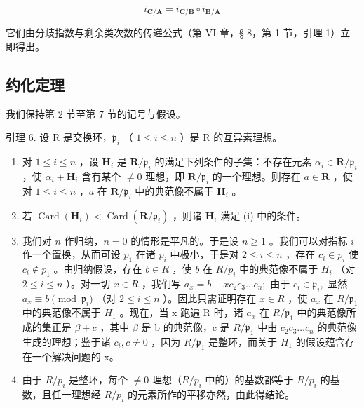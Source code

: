 \[
i _ {\mathbf {C} / \mathbf {A}} = i _ {\mathbf {C} / \mathbf {B}} \circ i _ {\mathbf {B} / \mathbf {A}}
\]

它们由分歧指数与剩余类次数的传递公式（第 VI 章，§ 8，第 1 节，引理 1）立即得出。

\subsection{约化定理}

我们保持第 2 节至第 7 节的记号与假设。

引理 6. 设 R 是交换环，\(\mathfrak{p}_i\) （ \(1 \leqslant i \leqslant n\) ）是 R 的互异素理想。

\begin{enumerate}
\def\labelenumi{(\roman{enumi})}
\item
  对 \(1 \leqslant i \leqslant n\) ，设 \(\mathbf{H}_i\) 是 \(\mathbf{R} / \mathfrak{p}_i\) 的满足下列条件的子集：不存在元素 \(\alpha_i \in \mathbf{R} / \mathfrak{p}_i\) ，使 \(\alpha_i + \mathbf{H}_i\) 含有某个 \(\neq 0\) 理想，即 \(\mathbf{R} / \mathfrak{p}_i\) 的一个理想。则存在 \(a \in \mathbf{R}\) ，使对 \(1 \leqslant i \leqslant n\) ，\(a\) 在 \(\mathbf{R} / \mathfrak{p}_i\) 中的典范像不属于 \(\mathbf{H}_i\) 。
\item
  若 \(\operatorname{Card}(\mathbf{H}_i) < \operatorname{Card}(\mathbf{R} / \mathfrak{p}_i)\) ，则诸 \(\mathbf{H}_i\) 满足 (i) 中的条件。
\item
  我们对 \(n\) 作归纳，\(n = 0\) 的情形是平凡的。于是设 \(n \geqslant 1\) 。我们可以对指标 \(i\) 作一个置换，从而可设 \(p_1\) 在诸 \(p_i\) 中极小，于是对 \(2 \leqslant i \leqslant n\) ，存在 \(c_i \in p_i\) 使 \(c_i \notin p_1\) 。由归纳假设，存在 \(b \in R\) ，使 \(b\) 在 \(R / p_i\) 中的典范像不属于 \(H_i\) （对 \(2 \leqslant i \leqslant n\) ）。对一切 \(x \in R\) ，我们写 \(a_{x}=b+xc_{2}c_{3}\ldots c_{n};\) 由于 \(c_{i}\in\mathfrak{p}_{i},\) 显然 \(a_{x}\equiv b\pmod{\mathfrak{p}_{i}}\) （对 \(2\leqslant i\leqslant n\) ）。因此只需证明存在 \(x\in R\) ，使 \(a_{x}\) 在 \(R/\mathfrak{p}_{1}\) 中的典范像不属于 \(H_{1}\) 。现在，当 x 跑遍 R 时，诸 \(a_{x}\) 在 \(R/\mathfrak{p}_{1}\) 中的典范像所成的集正是 \(\beta+c\) ，其中 \(\beta\) 是 b 的典范像，c 是 \(R/\mathfrak{p}_{1}\) 中由 \(c_{2}c_{3}\ldots c_{n}\) 的典范像生成的理想；鉴于诸 \(c_{i},c\neq0\) ，因为 \(R/\mathfrak{p}_{1}\) 是整环，而关于 \(H_{1}\) 的假设蕴含存在一个解决问题的 x。
\item
  由于 \(R/p_{i}\) 是整环，每个 \(\neq0\) 理想（\(R/p_{i}\) 中的）的基数都等于 \(R/p_{i}\) 的基数，且任一理想经 \(R/p_{i}\) 的元素所作的平移亦然，由此得结论。
\end{enumerate}

